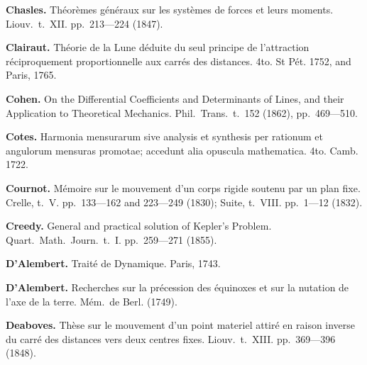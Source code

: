 \documentclass[12pt,a4paper]{article}
\theoremstyle{definition}
\begin{document}
\vspace{0.5em}

\noindent\textbf{Chasles.} Th\'{e}or\`{e}mes g\'{e}n\'{e}raux sur les syst\`{e}mes de forces et leurs moments. Liouv.~t.~XII. pp.~213---224 (1847).

\vspace{0.5em}

\noindent\textbf{Clairaut.} Th\'{e}orie de la Lune d\'{e}duite du seul principe de l'attraction r\'{e}ciproquement proportionnelle aux carr\'{e}s des distances. 4to. St P\'{e}t. 1752, and Paris, 1765.

\vspace{0.5em}

\noindent\textbf{Cohen.} On the Differential Coefficients and Determinants of Lines, and their Application to Theoretical Mechanics. Phil.~Trans.~t.~152 (1862), pp.~469---510.

\vspace{0.5em}

\noindent\textbf{Cotes.} Harmonia mensurarum sive analysis et synthesis per rationum et angulorum mensuras promotae; accedunt alia opuscula mathematica. 4to. Camb. 1722.

\vspace{0.5em}

\noindent\textbf{Cournot.} M\'{e}moire sur le mouvement d'un corps rigide soutenu par un plan fixe. Crelle, t.~V. pp.~133---162 and 223---249 (1830); Suite, t.~VIII. pp.~1---12 (1832).

\vspace{0.5em}

\noindent\textbf{Creedy.} General and practical solution of Kepler's Problem. Quart.~Math.~Journ.~t.~I. pp.~259---271 (1855).

\vspace{0.5em}

\noindent\textbf{D'Alembert.} Trait\'{e} de Dynamique. Paris, 1743.

\vspace{0.5em}

\noindent\textbf{D'Alembert.} Recherches sur la pr\'{e}cession des \'{e}quinoxes et sur la nutation de l'axe de la terre. M\'{e}m.~de Berl. (1749).

\vspace{0.5em}

\noindent\textbf{Deaboves.} Th\`{e}se sur le mouvement d'un point materiel attir\'{e} en raison inverse du carr\'{e} des distances vers deux centres fixes. Liouv.~t.~XIII. pp.~369---396 (1848).
\end{document}
